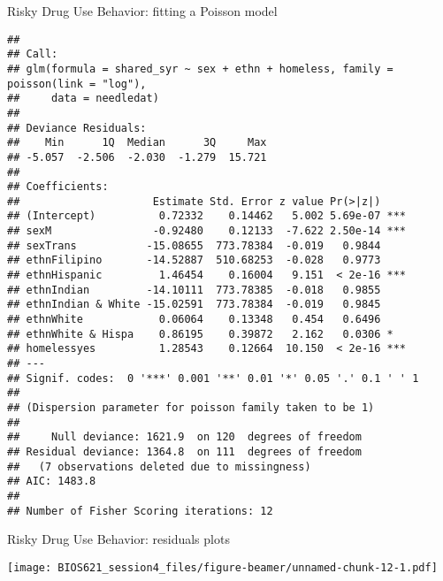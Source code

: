 \documentclass[ignorenonframetext,]{beamer}
\begin{document}
\begin{frame}[fragile]{Risky Drug Use Behavior: fitting a Poisson model}

\tiny

\begin{verbatim}
## 
## Call:
## glm(formula = shared_syr ~ sex + ethn + homeless, family = poisson(link = "log"), 
##     data = needledat)
## 
## Deviance Residuals: 
##    Min      1Q  Median      3Q     Max  
## -5.057  -2.506  -2.030  -1.279  15.721  
## 
## Coefficients:
##                     Estimate Std. Error z value Pr(>|z|)    
## (Intercept)          0.72332    0.14462   5.002 5.69e-07 ***
## sexM                -0.92480    0.12133  -7.622 2.50e-14 ***
## sexTrans           -15.08655  773.78384  -0.019   0.9844    
## ethnFilipino       -14.52887  510.68253  -0.028   0.9773    
## ethnHispanic         1.46454    0.16004   9.151  < 2e-16 ***
## ethnIndian         -14.10111  773.78385  -0.018   0.9855    
## ethnIndian & White -15.02591  773.78384  -0.019   0.9845    
## ethnWhite            0.06064    0.13348   0.454   0.6496    
## ethnWhite & Hispa    0.86195    0.39872   2.162   0.0306 *  
## homelessyes          1.28543    0.12664  10.150  < 2e-16 ***
## ---
## Signif. codes:  0 '***' 0.001 '**' 0.01 '*' 0.05 '.' 0.1 ' ' 1
## 
## (Dispersion parameter for poisson family taken to be 1)
## 
##     Null deviance: 1621.9  on 120  degrees of freedom
## Residual deviance: 1364.8  on 111  degrees of freedom
##   (7 observations deleted due to missingness)
## AIC: 1483.8
## 
## Number of Fisher Scoring iterations: 12
\end{verbatim}

\end{frame}

\begin{frame}{Risky Drug Use Behavior: residuals plots}

\texttt{[image: BIOS621\_session4\_files/figure-beamer/unnamed-chunk-12-1.pdf]}

\end{frame}
\end{document}
